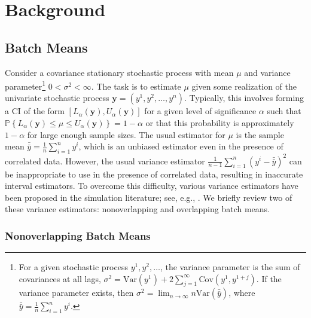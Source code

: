 \documentclass[12pt]{article}
\newcommand{\p}[1]{\mathbb{P} \left\{ #1 \right\}}
\newcommand{\y}{\mathbf{y}}
\newcommand{\yb}{\bar{y}}
\newcommand{\ybb}{\bar{\yb}}
\begin{document}
\section{Background}
\label{sec:background}


\subsection{Batch Means} 
\label{ssec:obm}

Consider a covariance stationary stochastic process with mean $\mu$ and variance parameter\footnote{For a given stochastic process $y^1, y^2, \dots$, the variance parameter is the sum of covariances at all lags, $\sigma^2=\mathrm{Var} \left(y^1 \right)+2\sum_{j=1}^{\infty}\mathrm{Cov} \left(y^1,y^{1+j}\right)$. If the variance parameter exists, then  $\sigma^2=\lim_{n\rightarrow \infty}n\mathrm{Var} \left(\ybb\right)$, where $\ybb=\frac{1}{n}\sum_{i=1}^{n} y^{i}$.} $0<\sigma^2<\infty$.  
The task is to estimate $\mu$ given some realization of the univariate stochastic process $\y = (y^1, y^2, \dots, y^n)$.  
Typically, this involves forming a CI of the form $[L_\alpha(\y), U_\alpha(\y)]$ for a given level of significance $\alpha$ such that $\p{L_\alpha(\y) \leq \mu \leq U_\alpha(\y)} = 1 - \alpha$ or that this probability is approximately $1 - \alpha$ for large enough sample sizes.  
The usual estimator for $\mu$ is the sample mean $\ybb = \frac{1}{n} \sum_{i=1}^n y^i$, which is an unbiased estimator even in the presence of correlated data.  
However, the usual variance estimator $\frac{1}{n-1} \sum_{i=1}^n (y^i - \ybb)^2$ can be inappropriate to use in the presence of correlated data, resulting in inaccurate interval estimators.  
To overcome this difficulty, various variance estimators have been proposed in the simulation literature; see, e.g., \citep{law_07}.  
We briefly review two of these variance estimators: nonoverlapping and overlapping batch means.

\subsubsection{Nonoverlapping Batch Means}
\end{document}
